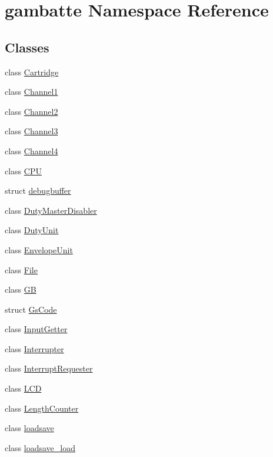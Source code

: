 \hypertarget{namespacegambatte}{}\section{gambatte Namespace Reference}
\label{namespacegambatte}
\subsection*{Classes}
\begin{DoxyCompactItemize}
\item 
class \hyperlink{classgambatte_1_1Cartridge}{Cartridge}
\item 
class \hyperlink{classgambatte_1_1Channel1}{Channel1}
\item 
class \hyperlink{classgambatte_1_1Channel2}{Channel2}
\item 
class \hyperlink{classgambatte_1_1Channel3}{Channel3}
\item 
class \hyperlink{classgambatte_1_1Channel4}{Channel4}
\item 
class \hyperlink{classgambatte_1_1CPU}{C\+PU}
\item 
struct \hyperlink{structgambatte_1_1debugbuffer}{debugbuffer}
\item 
class \hyperlink{classgambatte_1_1DutyMasterDisabler}{Duty\+Master\+Disabler}
\item 
class \hyperlink{classgambatte_1_1DutyUnit}{Duty\+Unit}
\item 
class \hyperlink{classgambatte_1_1EnvelopeUnit}{Envelope\+Unit}
\item 
class \hyperlink{classgambatte_1_1File}{File}
\item 
class \hyperlink{classgambatte_1_1GB}{GB}
\item 
struct \hyperlink{structgambatte_1_1GsCode}{Gs\+Code}
\item 
class \hyperlink{classgambatte_1_1InputGetter}{Input\+Getter}
\item 
class \hyperlink{classgambatte_1_1Interrupter}{Interrupter}
\item 
class \hyperlink{classgambatte_1_1InterruptRequester}{Interrupt\+Requester}
\item 
class \hyperlink{classgambatte_1_1LCD}{L\+CD}
\item 
class \hyperlink{classgambatte_1_1LengthCounter}{Length\+Counter}
\item 
class \hyperlink{classgambatte_1_1loadsave}{loadsave}
\item 
class \hyperlink{classgambatte_1_1loadsave__load}{loadsave\+\_\+load}

\end{DoxyCompactItemize}
